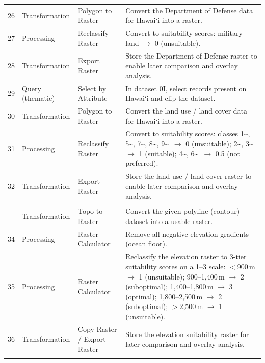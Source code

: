 \documentclass[12pt,a4paper]{article}
\newcommand{\okina}{\textquoteleft}
\begin{document}
\begin{landscape}
\begin{longtable}{@{}c >{\raggedright\arraybackslash}p{2.8cm} >{\raggedright\arraybackslash}p{6.5cm} >{\raggedright\arraybackslash}p{12.8cm}@{}}
  26 & Transformation & Polygon to Raster & Convert the Department of Defense data for Hawai\okina i into a raster. \\
  27 & Processing & Reclassify Raster & Convert to suitability scores: military land $\rightarrow$ 0 (unsuitable). \\
  28 & Transformation & Export Raster & Store the Department of Defense raster to enable later comparison and overlay analysis. \\
  29 & Query (thematic) & Select by Attribute & In dataset 0I, select records present on Hawai\okina i and clip the dataset. \\
  30 & Transformation & Polygon to Raster & Convert the land use / land cover data for Hawai\okina i into a raster. \\
  31 & Processing & Reclassify Raster & Convert to suitability scores: classes 1\textasciitilde, 5\textasciitilde, 7\textasciitilde, 8\textasciitilde, 9\textasciitilde~$\rightarrow$ 0 (unsuitable); 2\textasciitilde, 3\textasciitilde~$\rightarrow$ 1 (suitable); 4\textasciitilde, 6\textasciitilde~$\rightarrow$ 0.5 (not preferred). \\
  32 & Transformation & Export Raster & Store the land use / land cover raster to enable later comparison and overlay analysis. \\
  \addlinespace
  \multicolumn{4}{@{}l}{\textit{\textbf{Elevation}}} \\
  \addlinespace
  33 & Transformation & Topo to Raster & Convert the given polyline (contour) dataset into a usable raster. \\
  34 & Processing & Raster Calculator & Remove all negative elevation gradients (ocean floor). \\
  35 & Processing & Raster Calculator & Reclassify the elevation raster to 3-tier suitability scores on a 1--3 scale: $<$900\,m $\rightarrow$ 1 (unsuitable); 900--1{,}400\,m $\rightarrow$ 2 (suboptimal); 1{,}400--1{,}800\,m $\rightarrow$ 3 (optimal); 1{,}800--2{,}500\,m $\rightarrow$ 2 (suboptimal); $>$2{,}500\,m $\rightarrow$ 1 (unsuitable). \\
  36 & Transformation & Copy Raster / Export Raster & Store the elevation suitability raster for later comparison and overlay analysis. \\
  \addlinespace
  \multicolumn{4}{@{}l}{\textit{\textbf{Suitability modelling} (all projections)}} \\

\end{longtable}
\end{landscape}
\end{document}
